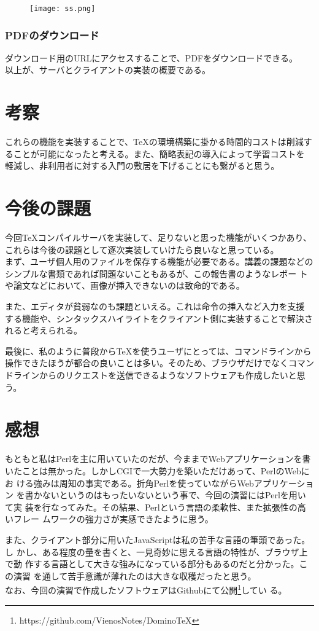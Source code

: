 \documentclass[a4j,9pt,titlepage]{jsarticle}
\begin{document}
\begin{figure}[H]
 \begin{center}
  \texttt{[image: ss.png]}
 \end{center}
\end{figure}
\subsubsection{PDFのダウンロード}
ダウンロード用のURLにアクセスすることで、PDFをダウンロードできる。\\

以上が、サーバとクライアントの実装の概要である。
\section{考察}
これらの機能を実装することで、TeXの環境構築に掛かる時間的コストは削減す
ることが可能になったと考える。また、簡略表記の導入によって学習コストを
軽減し、非利用者に対する入門の敷居を下げることにも繋がると思う。

\section{今後の課題}
今回TeXコンパイルサーバを実装して、足りないと思った機能がいくつかあり、
これらは今後の課題として逐次実装していけたら良いなと思っている。\\

まず、ユーザ個人用のファイルを保存する機能が必要である。講義の課題などの
シンプルな書類であれば問題ないこともあるが、この報告書のようなレポー
トや論文などにおいて、画像が挿入できないのは致命的である。

また、エディタが貧弱なのも課題といえる。これは命令の挿入など入力を支援
する機能や、シンタックスハイライトをクライアント側に実装することで解決さ
れると考えられる。

最後に、私のように普段からTeXを使うユーザにとっては、コマンドラインから
操作できたほうが都合の良いことは多い。そのため、ブラウザだけでなくコマン
ドラインからのリクエストを送信できるようなソフトウェアも作成したいと思う。

\section{感想}
もともと私はPerlを主に用いていたのだが、今ままでWebアプリケーションを書
いたことは無かった。しかしCGIで一大勢力を築いただけあって、PerlのWebにお
ける強みは周知の事実である。折角Perlを使っていながらWebアプリケーション
を書かないというのはもったいないという事で、今回の演習にはPerlを用いて実
装を行なってみた。その結果、Perlという言語の柔軟性、また拡張性の高いフレー
ムワークの強力さが実感できたように思う。

また、クライアント部分に用いたJavaScriptは私の苦手な言語の筆頭であった。し
かし、ある程度の量を書くと、一見奇妙に思える言語の特性が、ブラウザ上で動
作する言語として大きな強みになっている部分もあるのだと分かった。この演習
を通して苦手意識が薄れたのは大きな収穫だったと思う。\\

なお、今回の演習で作成したソフトウェアはGithubにて公開\footnote{https://github.com/VienosNotes/DominoTeX}してい
る。
\end{document}
